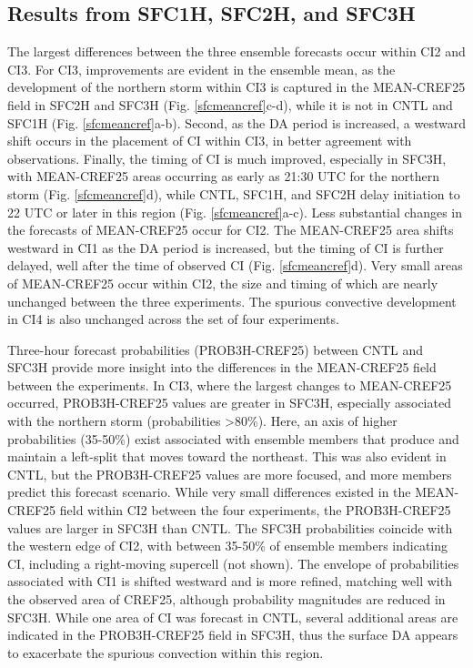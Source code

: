 \subsection{Results from SFC1H, SFC2H, and SFC3H}
The largest differences between the three ensemble forecasts occur within CI2 and CI3. For CI3, improvements are evident in the ensemble mean, as the development of the northern storm within CI3 is captured in the MEAN-CREF25 field in SFC2H and SFC3H (Fig. \ref{sfcmeancref}c-d), while it is not in CNTL and SFC1H (Fig. \ref{sfcmeancref}a-b). Second, as the DA period is increased, a westward shift occurs in the placement of CI within CI3, in better agreement with observations. Finally, the timing of CI is much improved, especially in SFC3H, with MEAN-CREF25 areas occurring as early as 21:30 UTC for the northern storm (Fig. \ref{sfcmeancref}d), while CNTL, SFC1H, and SFC2H delay initiation to 22 UTC or later in this region (Fig. \ref{sfcmeancref}a-c). Less substantial changes in the forecasts of MEAN-CREF25 occur for CI2. The MEAN-CREF25 area shifts westward in CI1 as the DA period is increased, but the timing of CI is further delayed, well after the time of observed CI (Fig. \ref{sfcmeancref}d). Very small areas of MEAN-CREF25 occur within CI2, the size and timing of which are nearly unchanged between the three experiments. The spurious convective development in CI4 is also unchanged across the set of four experiments.

Three-hour forecast probabilities (PROB3H-CREF25) between CNTL and SFC3H provide more insight into the differences in the MEAN-CREF25 field between the experiments. In CI3, where the largest changes to MEAN-CREF25 occurred, PROB3H-CREF25 values are greater in SFC3H, especially associated with the northern storm (probabilities \textgreater 80\%). Here, an axis of higher probabilities (35-50\%) exist associated with ensemble members that produce and maintain a left-split that moves toward the northeast. This was also evident in CNTL, but the PROB3H-CREF25 values are more focused, and more members predict this forecast scenario. While very small differences existed in the MEAN-CREF25 field within CI2 between the four experiments, the PROB3H-CREF25 values are larger in SFC3H than CNTL. The SFC3H probabilities coincide with the western edge of CI2, with between 35-50\% of ensemble members indicating CI, including a right-moving supercell (not shown). The envelope of probabilities associated with CI1 is shifted westward and is more refined, matching well with the observed area of CREF25, although probability magnitudes are reduced in SFC3H. While one area of CI was forecast in CNTL, several additional areas are indicated in the PROB3H-CREF25 field in SFC3H, thus the surface DA appears to exacerbate the spurious convection within this region.

